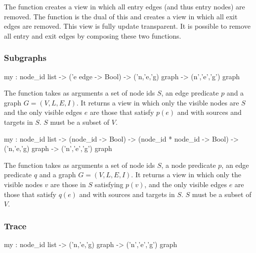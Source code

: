 The function  creates a view in which
all entry edges (and thus entry nodes) are removed.   The function
 is the dual of this and creates a view in which
all exit edges are removed.  This view is fully update transparent.
It is possible to remove all entry and exit edges by composing these
two functions.

\subsubsection{Subgraphs} 
\begin{SML}
   my  : node_id list -> ('e edge -> Bool) -> 
     ('n,'e,'g) graph -> (n','e','g') graph
\end{SML}

   The function  takes as arguments a set of node ids
$S$, an edge predicate $p$ and a graph $G=(V,L,E,I)$.  It
returns a view in which only the visible nodes are $S$ and
the only visible edges $e$ are those that satisfy $p(e)$ and
with sources and targets in $S$.  $S$ must be a subset of $V$.

\begin{SML}
   my  : node_id list -> 
     (node_id -> Bool) -> (node_id * node_id -> Bool) ->
     ('n,'e,'g) graph -> ('n','e','g') graph
\end{SML}

   The function  takes as arguments a set of node ids
$S$, a node predicate $p$, an edge predicate $q$ and a graph $G=(V,L,E,I)$.  It
returns a view in which only the visible nodes $v$ are those 
in $S$ satisfying $p(v)$, and
the only visible edges $e$ are those that satisfy $q(e)$ and
with sources and targets in $S$.  $S$ must be a subset of $V$.

\subsubsection{Trace}
\begin{SML}
   my  : node_id list -> ('n,'e,'g) graph -> ('n','e','g') graph
\end{SML}

